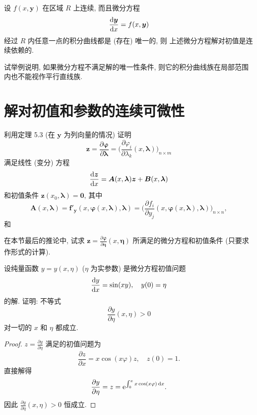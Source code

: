 \begin{exercise}
  设 $f(x,\bm{y})$ 在区域 $R$ 上连续, 而且微分方程
  \[\frac{\mathop{}\!\mathrm{d}\bm{y}}{\mathop{}\!\mathrm{d} x} = f(x,\bm{y})\]
  经过 $R$ 内任意一点的积分曲线都是 (存在) 唯一的, 则
  上述微分方程解对初值是连续依赖的.
\end{exercise}



\begin{exercise}
  试举例说明, 如果微分方程不满足解的唯一性条件,
  则它的积分曲线族在局部范围内也不能视作平行直线族.
\end{exercise}



\section{解对初值和参数的连续可微性}



\begin{exercise}
  利用定理 5.3 (在 $\bm{y}$ 为列向量的情况) 证明
  \[\bm{z} = \frac{\partial\bm{\varphi}}{\partial\bm{\lambda}}
    = \biggl(\frac{\partial\varphi_i}{\partial\lambda_k}(x,\bm{\lambda})\biggr)_{n\times m}\]
  满足线性 (变分) 方程
  \[\frac{\mathop{}\!\mathrm{d}\bm{z}}{\mathop{}\!\mathrm{d} x} = \bm{A}(x,\bm{\lambda})\bm{z}
    + \bm{B}(x,\bm{\lambda})\]
  和初值条件 $\bm{z}(x_0,\bm{\lambda})=\bm{0}$, 其中
  \[\bm{A}(x,\bm{\lambda}) = \bm{f}'_{\bm{y}}(x,\bm{\varphi}(x,\bm{\lambda}),\bm{\lambda})
    = \biggl(\frac{\partial f_i}{\partial y_j}(x,\bm{\varphi}(x,\bm{\lambda}),\bm{\lambda})\biggr)
    _{n\times n},\]
  和
\end{exercise}



\begin{exercise}
  在本节最后的推论中, 试求 $\bm{z} = \frac{\partial\bm{\varphi}}{\partial\bm{\eta}}(x,\bm{\eta})$
  所满足的微分方程和初值条件 (只要求作形式的计算).
\end{exercise}



\begin{exercise}
  设纯量函数 $y=y(x,\eta)$ ($\eta$ 为实参数) 是微分方程初值问题
  \[\frac{\mathop{}\!\mathrm{d} y}{\mathop{}\!\mathrm{d} x} = \sin(xy),\quad y(0)=\eta\]
  的解. 证明: 不等式
  \[\frac{\partial y}{\partial\eta}(x,\eta)>0\]
  对一切的 $x$ 和 $\eta$ 都成立.
\end{exercise}

\begin{proof}
  $z=\frac{\partial y}{\partial\eta}$ 满足的初值问题为
  \[\frac{\partial z}{\partial x} = x\cos(x\varphi)z,\quad z(0)=1.\]
  直接解得
  \[\frac{\partial y}{\partial\eta} = z = \mathrm{e}^{\int_{0}^x x\cos(x\varphi)\mathop{}\!\mathrm{d} x}.\]
  因此 $\frac{\partial y}{\partial\eta}(x,\eta)>0$ 恒成立.
\end{proof}